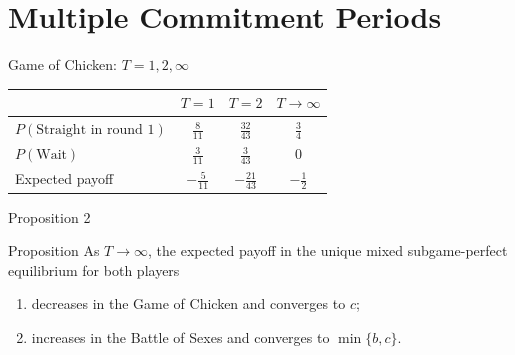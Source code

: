 \documentclass[slides.tex]{subfiles}
\begin{document}
\section{Multiple Commitment Periods}
\begin{frame}{Game of Chicken: \(T=1,2,\infty\)}
\centering
\renewcommand{\arraystretch}{1.3}
\begin{tabular}{lccc}
\toprule
 & \(T=1\) & \(T=2\) & \(T\to\infty\) \\
\midrule
\(P(\text{Straight in round 1})\) 
  & \(\tfrac{8}{11}\) 
  & \(\tfrac{32}{43}\) 
  & \(\tfrac{3}{4}\) \\[6pt]
\(P(\text{Wait})\) 
  & \(\tfrac{3}{11}\) 
  & \(\tfrac{3}{43}\) 
  & \(0\) \\[6pt]
Expected payoff 
  & \(-\tfrac{5}{11}\) 
  & \(-\tfrac{21}{43}\) 
  & \(-\tfrac{1}{2}\) \\
\bottomrule
\end{tabular}

\end{frame}
\begin{frame}{Proposition 2}
\begin{block}{Proposition}
As \(T \to \infty\), the expected payoff in the unique mixed subgame-perfect equilibrium for both players
\begin{enumerate}
    \item decreases in the Game of Chicken and converges to \(c\);
    \item increases in the Battle of Sexes and converges to \(\min\{b,c\}\).
\end{enumerate}
\end{block}
\end{frame}
\end{document}
